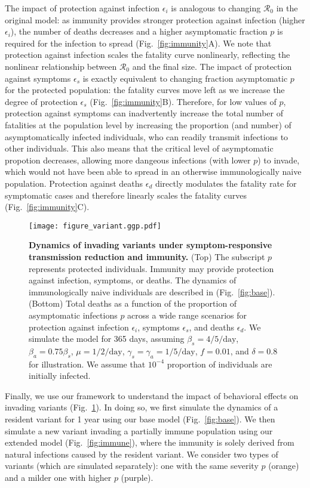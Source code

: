 \documentclass[12pt]{article}
\newcommand{\fref}[1]{Fig.~\ref{fig:#1}}
\newcommand{\RR}{\ensuremath{{\mathcal R}}\xspace}
\begin{document}
The impact of protection against infection $\epsilon_i$ is analogous to changing $\RR_0$ in the original model: as immunity provides stronger protection against infection (higher $\epsilon_i$), the number of deaths decreases and a higher asymptomatic fraction $p$ is required for the infection to spread (\fref{immunity}A).
We note that protection against infection scales the fatality curve nonlinearly, reflecting the nonlinear relationship between $\RR_0$ and the final size.
The impact of protection against symptoms $\epsilon_s$ is exactly equivalent to changing fraction asymptomatic $p$ for the protected population:
the fatality curves move left as we increase the degree of protection $\epsilon_s$ (\fref{immunity}B).
Therefore, for low values of $p$, protection against symptoms can inadvertently increase the total number of fatalities at the population level by increasing the proportion (and number) of asymptomatically infected individuals, who can readily transmit infections to other individuals.
This also means that the critical level of asymptomatic propotion decreases, allowing more dangeous infections (with lower $p$) to invade, which would not have been able to spread in an otherwise immunologically naive population.
Protection against deaths $\epsilon_d$ directly modulates the fatality rate for symptomatic cases and therefore linearly scales the fatality curves (\fref{immunity}C).

\begin{figure}[!ht]
\texttt{[image: figure\_variant.ggp.pdf]}
\caption{
\textbf{Dynamics of invading variants under symptom-responsive transmission reduction and immunity.}
(Top) The subscript $p$ represents protected individuals. 
Immunity may provide protection against infection, symptoms, or deaths.
The dynamics of immunologically naive individuals are described in (\fref{base}).
(Bottom) Total deaths as a function of the proportion of asymptomatic infections $p$ across a wide range scenarios for protection against infection $\epsilon_i$, symptoms $\epsilon_s$, and deaths $\epsilon_d$.
We simulate the model for 365 days, assuming $\beta_s = 4/5/\mathrm{day}$, $\beta_a = 0.75 \beta_s$, $\mu=1/2/\mathrm{day}$, $\gamma_s=\gamma_a=1/5/\mathrm{day}$, $f=0.01$, and $\delta=0.8$ for illustration.
We assume that $10^{-4}$ proportion of individuals are initially infected.
}
\label{fig:variant}
\end{figure}

Finally, we use our framework to understand the impact of behavioral effects on invading variants (\fref{variant}).
In doing so, we first simulate the dynamics of a resident variant for 1 year using our base model (\fref{base}).
We then simulate a new variant invading a partially immune population using our extended model (\fref{immune}), where the immunity is solely derived from natural infections caused by the resident variant.
We consider two types of variants (which are simulated separately): one with the same severity $p$ (orange) and a milder one with higher $p$ (purple).
\end{document}
